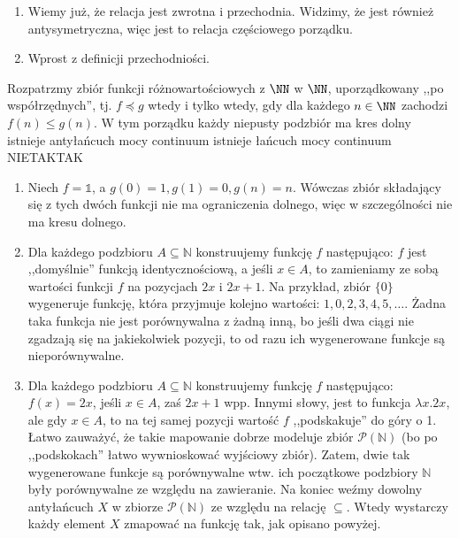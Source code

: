 \begin{solutions}
\begin{enumerate}[\bf A.]
        \item Wiemy już, że relacja jest zwrotna i przechodnia. Widzimy, że jest również antysymetryczna, więc jest to relacja częściowego porządku.

        \item Wprost z definicji przechodniości.
    \end{enumerate}

    \sol Rozpatrzmy zbiór funkcji różnowartościowych z $\NN$ w $\NN$, uporządkowany ,,po współrzędnych'', tj. $f \preceq g$ wtedy i tylko wtedy, gdy dla każdego $n \in \NN$ zachodzi $f(n) \leq g(n)$. W tym porządku
    \answerss
    {każdy niepusty podzbiór ma kres dolny}
    {istnieje antyłańcuch mocy continuum}
    {istnieje łańcuch mocy continuum}
    {NIE}{TAK}{TAK}

    \begin{enumerate}[\bf A.]
        \item Niech $f = \mathds{1} $, a $g(0) = 1, g(1) = 0, g(n) = n$. Wówczas zbiór składający się z tych dwóch funkcji nie ma ograniczenia dolnego, więc w szczególności nie ma kresu dolnego.

        \item Dla każdego podzbioru $A \subseteq \mathbb{N}$ konstruujemy funkcję $f$ następująco: $f$ jest ,,domyślnie'' funkcją identycznościową, a jeśli $x \in A$, to zamieniamy ze sobą wartości funkcji $f$ na pozycjach $2x$ i $2x + 1$. Na przykład, zbiór $\{ 0 \}$ wygeneruje funkcję, która przyjmuje kolejno wartości: $1, 0, 2, 3, 4, 5, \ldots$. Żadna taka funkcja nie jest porównywalna z żadną inną, bo jeśli dwa ciągi nie zgadzają się na jakiekolwiek pozycji, to od razu ich wygenerowane funkcje są nieporównywalne.

        \item Dla każdego podzbioru $A \subseteq \mathbb{N}$ konstruujemy funkcję $f$ następująco: $f(x) = 2x$, jeśli $x \in A$, zaś $2x + 1$ wpp. Innymi słowy, jest to funkcja $\lambda x.2x$, ale gdy $x \in A$, to na tej samej pozycji wartość $f$ ,,podskakuje'' do góry o 1. Łatwo zauważyć, że takie mapowanie dobrze modeluje zbiór $\mathcal{P}(\mathbb{N})$ (bo po ,,podskokach'' łatwo wywnioskować wyjściowy zbiór). Zatem, dwie tak wygenerowane funkcje są porównywalne wtw. ich początkowe podzbiory $\mathbb{N}$ były porównywalne ze względu na zawieranie. Na koniec weźmy dowolny antyłańcuch $X$ w zbiorze $\mathcal{P}(\mathbb{N})$ ze względu na relację $\subseteq$. Wtedy wystarczy każdy element $X$ zmapować na funkcję tak, jak opisano powyżej.
    \end{enumerate}
    

\end{solutions}
